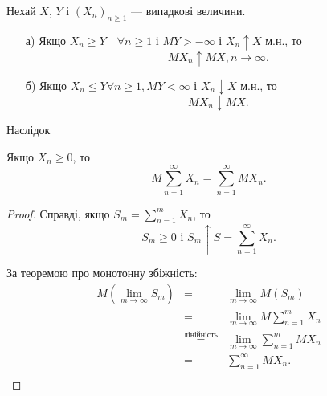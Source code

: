 \begin{theorem}
    Нехай $X$, $Y$ і $(X_n)_{n \geqslant 1}$ --- випадкові величини.
    
    \begin{itemize}
        \item[а)] Якщо $X_n \geqslant Y \quad \forall n \geqslant 1$
            і $MY > - \infty$ і $X_n \uparrow X$ м.н., то
            $$MX_n \uparrow MX, n \rightarrow \infty.$$
        \item[б)] Якщо $X_n \leqslant Y \forall n \geqslant 1, MY < \infty$
            і $X_n \downarrow X$ м.н., то
            $$MX_n \downarrow MX.$$
    \end{itemize}
\end{theorem}

Наслідок
\begin{corollary}
    Якщо $X_n \geqslant 0$, то
    $$M\sum\limits_{n=1}^{\infty} X_n
    = \sum\limits_{n=1}^{\infty} MX_n.$$
\end{corollary}
\begin{proof}
    Справді, якщо $S_m = \sum\limits_{n=1}^{m} X_n$, то 
    $$S_m \geqslant 0 \text{ і } S_m \uparrow S = \sum\limits_{n=1}^{\infty} X_n.$$
    
    За теоремою  про монотонну збіжність:
    $$\begin{array}{rcl}
        M(\lim\limits_{m \rightarrow \infty} S_m) & = & \lim\limits_{m \rightarrow \infty} M(S_m) \\
        & = & \lim\limits_{m \rightarrow \infty} M \sum\limits_{n=1}^{m} X_n \\
        & \stackrel{\text{лінійність}}{=} & \lim\limits_{m \rightarrow \infty} \sum\limits_{n=1}^{m} M X_n \\
        & = & \sum\limits_{n=1}^{\infty} M X_n. \\
    \end{array}$$
\end{proof}

